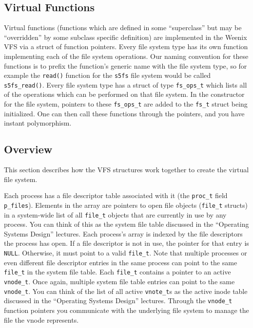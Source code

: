 \subsection{Virtual Functions}

Virtual functions (functions which are defined in some ``superclass'' but may be ``overridden'' by some subclass specific definition) are implemented in the Weenix VFS via a struct of function pointers. Every file system type has its own function implementing each of the file system operations. Our naming convention for these functions is to prefix the function's generic name with the file system type, so for example the \texttt{read()} function for the \texttt{s5fs} file system would be called \texttt{s5fs\_read()}. Every file system type has a struct of type \texttt{fs\_ops\_t} which lists all of the operations which can be performed on that file system. In the constructor for the file system, pointers to these \texttt{fs\_ops\_t} are added to the \texttt{fs\_t} struct being initialized. One can then call these functions through the pointers, and you have instant polymorphism.

\subsection{Overview}

This section describes how the VFS structures work together to create the virtual file system.

Each process has a file descriptor table associated with it (the \texttt{proc\_t} field \texttt{p\_files}). Elements in the array are pointers to open file objects (\texttt{file\_t} structs) in a system-wide list of all \texttt{file\_t} objects that are currently in use by any process. You can think of this as the system file table discussed in the ``Operating Systems Design'' lectures.
Each process's array is indexed by the file descriptors the process has open. If a file descriptor is not in use, the pointer for that entry is \texttt{NULL}. Otherwise, it must point to a valid \texttt{file\_t}. Note that multiple processes or even different file descriptor entries in the same process can point to the same \texttt{file\_t} in the system file table. Each \texttt{file\_t} contains a pointer to an active \texttt{vnode\_t}. Once again, multiple system file table entries can point to the same \texttt{vnode\_t}. You can think of the list of all active \texttt{vnote\_t}s as the active inode table discussed in the ``Operating Systems Design'' lectures.
Through the \texttt{vnode\_t} function pointers you communicate with the underlying file system to manage the file the vnode represents.

